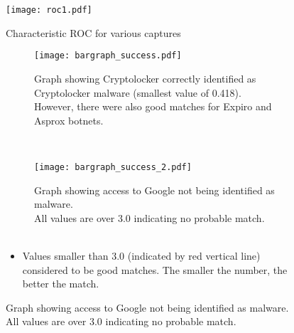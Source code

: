 \documentclass[13pt,journal,compsoc,onecolumn]{IEEEtran}
\begin{document}
\begin{figure}[h!]
  \centering
  \texttt{[image: roc1.pdf]}
  \caption{Characteristic ROC for various captures \label{fig:roc1}}
\end{figure}

\begin{figure}[h!]
 \centering
 \caption{Bar graphs showing numerical results for Cryptolocker and HTTP connection to Google}
 \begin{subfigure}[b]{0.45\textwidth}
  \centering
  \texttt{[image: bargraph\_success.pdf]}
  \caption{Graph showing Cryptolocker correctly identified as Cryptolocker malware (smallest value of 0.418).\\However, there were also good matches for Expiro and Asprox botnets.\label{fig:bg1}}
 \end{subfigure} 
  ~~~
 \begin{subfigure}[b]{0.45\textwidth}
  \texttt{[image: bargraph\_success\_2.pdf]}
  \caption{Graph showing access to Google not being identified as malware.\\All values are over 3.0 indicating no probable match.\\ ~~\label{fig:bg2}}
 \end{subfigure}
 \begin{itemize}
 \item Values smaller than 3.0 (indicated by red vertical line) considered to be good matches. The smaller the number, the better the match.
 \end{itemize}
\end{figure}




\end{document}
